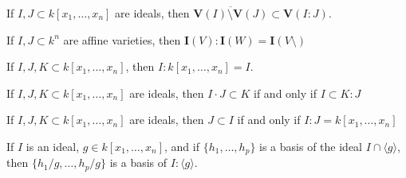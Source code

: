 \documentclass[crop=false,class=article,oneside]{standalone}
\begin{document}
            \begin{theorem}
                If $I,J\subset k[x_1,\hdots ,x_n]$ are ideals,
                then
                $\overline{\mathbf{V}(I)\setminus%
                 \mathbf{V}(J)}\subset\mathbf{V}(I:J)$.
            \end{theorem}
            \begin{theorem}
                If $I,J\subset k^n$ are affine varieties,
                then $\textbf{I}(V):\textbf{I}(W)=\textbf{I}(V\setminus)$
            \end{theorem}
            \begin{theorem}
                If $I,J,K\subset k[x_1,\hdots ,x_n]$,
                then $I:k[x_1,\hdots ,x_n]=I$.
            \end{theorem}
            \begin{theorem}
                If $I,J,K \subset k[x_1,\hdots ,x_n]$ are ideals,
                then $I\cdot J\subset K$ if and only if $I\subset K:J$
            \end{theorem}
            \begin{theorem}
                If $I,J,K\subset k[x_1,\hdots ,x_n]$ are ideals,
                then $J\subset I$ if and only if
                $I:J=k[x_1,\hdots ,x_n]$
            \end{theorem}
            \begin{theorem}
                If $I$ is an ideal, $g\in k[x_1,\hdots ,x_n]$,
                and if $\{h_1,\hdots, h_p\}$ is a basis of the
                ideal $I\cap \langle g \rangle$, then
                $\{h_1/g,\hdots, h_p/g\}$ is a basis of
                $I:\langle g\rangle$.
            \end{theorem}
\end{document}
